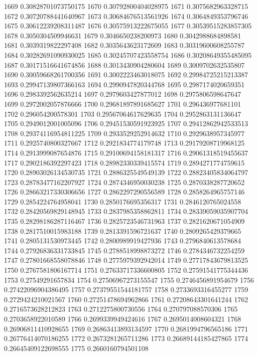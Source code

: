 1669 0.30828701073750175
1670 0.30792800404028975
1671 0.3075682963328715
1672 0.30720788441640967
1673 0.30684676513561926
1674 0.3064849353796746
1675 0.30612239208311487
1676 0.30575913222675055
1677 0.30539515283857305
1678 0.3050304509946631
1679 0.3046650238200973
1680 0.3042988684898581
1681 0.3039319822297408
1682 0.3035643623172609
1683 0.30319600608255787
1684 0.30282691090930025
1685 0.30245707423558754
1686 0.30208649355485095
1687 0.30171516641674856
1688 0.3013430904280604
1689 0.3009702632535807
1690 0.30059668261700356
1691 0.3002223463018075
1692 0.29984725215213387
1693 0.29947139807366163
1694 0.2990947820344768
1695 0.2987174020659351
1696 0.2983392562635214
1697 0.2979603427877012
1698 0.2975806598647647
1699 0.2972002057876666
1700 0.29681897891685627
1701 0.296436977681101
1702 0.296054200578301
1703 0.29567064617629635
1704 0.2952863131136647
1705 0.2949012001005096
1706 0.29451530591923925
1707 0.29412862942533513
1708 0.29374116954811225
1709 0.2933529252914632
1710 0.2929638957345977
1711 0.2925740800327667
1712 0.2921834774179748
1713 0.29179208719968125
1714 0.2913999087654876
1715 0.29100694158181317
1716 0.29061318519455637
1717 0.2902186392297423
1718 0.28982330339415574
1719 0.2894271774759615
1720 0.28903026134530735
1721 0.2886325549549139
1722 0.28823405834064797
1723 0.28783477162207927
1724 0.2874346950030238
1725 0.2870338287720652
1726 0.28663217330306656
1727 0.2862297290556589
1728 0.2858264965757146
1729 0.2854224764958041
1730 0.2850176695356317
1731 0.2846120765024558
1732 0.28420569829148945
1733 0.2837985358862811
1734 0.28339059035907704
1735 0.28298186287116467
1736 0.2825723546731963
1737 0.2821620671054909
1738 0.2817510015983188
1739 0.2813391596721637
1740 0.2809265429379665
1741 0.2805131530973445
1742 0.2800989919427936
1743 0.2796840613578684
1744 0.27926836331733845
1745 0.2788518998873272
1746 0.2784346732254259
1747 0.27801668558078846
1748 0.2775979392942014
1749 0.27717843679813525
1750 0.2767581806167714
1751 0.27633717336600805
1752 0.27591541775344436
1753 0.27549291657834
1754 0.27506967273155547
1755 0.2746456891954679
1756 0.27422096904386495
1757 0.27379551544181757
1758 0.2733693316455277
1759 0.2729424210021567
1760 0.27251478694962866
1761 0.27208643301641244
1762 0.2716573628212823
1763 0.2712275800730556
1764 0.270797088570306
1765 0.2703658922010589
1766 0.2699339949424616
1767 0.2695014008604321
1768 0.26906811410928655
1769 0.26863413893134597
1770 0.2681994796565186
1771 0.26776414070186255
1772 0.2673281265711286
1773 0.26689144185427865
1774 0.26645409122698555
1775 0.2660160794501108
